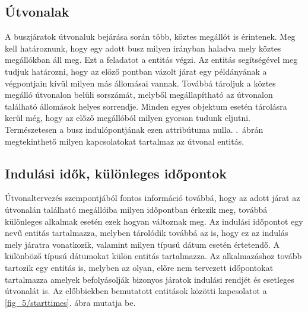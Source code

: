 \subsection*{Útvonalak}
\label{linehasstationsdetails}
A buszjáratok útvonaluk bejárása során több, köztes megállót is érintenek. 
Meg kell határoznunk, hogy egy adott busz milyen irányban haladva mely köztes megállókban áll meg. 
Ezt a feladatot a  entitás végzi. 
Az entitás segítségével meg tudjuk határozni, hogy az előző pontban vázolt járat egy példányának a végpontjain kívül milyen más állomásai vannak. 
Továbbá tároljuk a köztes megálló útvonalon belüli sorszámát, melyből megállapítható az útvonalon található állomások helyes sorrendje. 
Minden egyes objektum esetén tárolásra kerül még, hogy az előző megállóból milyen gyorsan tudunk eljutni. 
Természetesen a busz indulópontjának ezen attribútuma nulla. 
.\ ábrán megtekinthető milyen kapcsolatokat tartalmaz az útvonal entitás. 
\subsection*{Indulási idők, különleges időpontok}
\label{starttimes}
Útvonaltervezés szempontjából fontos információ továbbá, hogy az adott járat az útvonalán található megállóiba milyen időpontban érkezik meg, továbbá különleges alkalmak esetén ezek hogyan változnak meg. 
Az indulási időpontot egy  nevű entitás tartalmazza, melyben tárolódik továbbá az is, hogy ez az indulás mely járatra vonatkozik, valamint milyen típusú dátum esetén értetendő. 
A különböző típusú dátumokat külön entitás tartalmazza. 
Az alkalmazáshoz tovább tartozik egy  entitás is, melyben az olyan, előre nem tervezett időpontokat tartalmazza amelyek befolyásolják bizonyos járatok indulási rendjét és esetleges útvonalát is. 
Az előbbiekben bemutatott entitások közötti kapcsolatot a \ref{fig_5/starttimes}. ábra mutatja be. 

